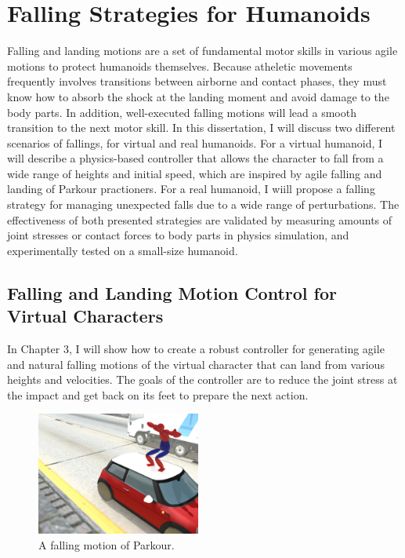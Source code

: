 \section{Falling Strategies for Humanoids}
Falling and landing motions are a set of fundamental motor skills
in various agile motions to protect humanoids themselves.
Because atheletic movements frequently involves
transitions between airborne and contact phases, they must know how to
absorb the shock at the landing moment and avoid damage to the body parts.
In addition, well-executed falling motions will lead a smooth transition to the
next motor skill. 
In this dissertation, I will discuss two different scenarios of fallings, 
for  virtual and real humanoids.
For a virtual humanoid, I will describe a physics-based controller that allows
the character to fall from a wide range of heights and initial speed, 
which are inspired by agile falling and landing of Parkour practioners.
For a real humanoid, I wiill propose a falling strategy for managing unexpected
falls due to a wide range of perturbations.
The effectiveness of both presented strategies are validated by measuring
amounts of joint stresses or contact forces to body parts in physics
simulation, and experimentally tested on a small-size humanoid.

\subsection{Falling and Landing Motion Control for Virtual Characters}

In Chapter 3, I will show how to create a robust controller for generating 
agile and natural falling motions of the virtual character that can land from 
various heights and velocities.
The goals of the controller are to reduce the joint stress at the impact and
get back on its feet to prepare the next action.

\begin{figure}
 \vspace{-25pt}
  \begin{center}
    \includegraphics[width=0.48\textwidth]{images/intro_landing.jpg}
  \end{center}
   \vspace{-25pt}
  \caption{A falling motion of Parkour.}
  \label{fig:intro_landing}
   \vspace{-10pt}
\end{figure}

